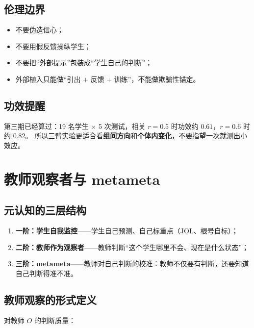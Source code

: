 \documentclass[UTF8,a4paper,11pt]{ctexart}
\begin{document}
\subsection{伦理边界}

\begin{itemize}[leftmargin=2em]
\item 不要伪造信心；
\item 不要用假反馈操纵学生；
\item 不要把“外部提示”包装成“学生自己的判断”；
\item 外部植入只能做“引出 + 反馈 + 训练”，不能做欺骗性锚定。
\end{itemize}

\subsection{功效提醒}

第三期已经算过：19 名学生 $\times$ 5 次测试，相关 $r=0.5$ 时功效约 $0.61$，$r=0.6$ 时约 $0.82$。
所以三臂实验更适合看\textbf{组间方向}和\textbf{个体内变化}，不要指望一次就测出小效应。

\newpage

\section{教师观察者与 metameta}

\subsection{元认知的三层结构}

\begin{enumerate}[leftmargin=2em]
\item \textbf{一阶：学生自我监控}——学生自己预测、自己标重点（JOL、根号自标）；
\item \textbf{二阶：教师作为观察者}——教师判断“这个学生哪里不会、现在是什么状态”；
\item \textbf{三阶：metameta}——教师对自己判断的校准：教师不仅要有判断，还要知道自己判断得准不准。
\end{enumerate}

\subsection{教师观察的形式定义}

对教师 $O$ 的判断质量：
\end{document}
